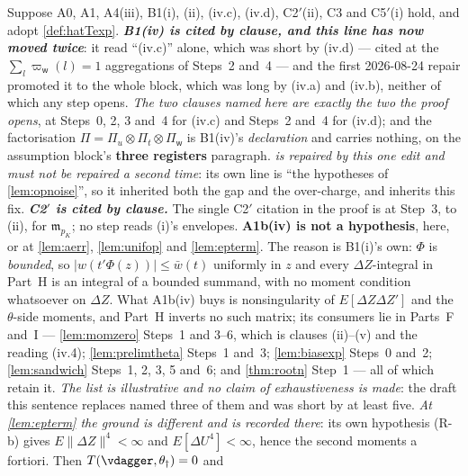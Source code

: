 \begin{lemma}\label{lem:opnoise}
Suppose A0, A1, A4(iii), B1(i), (ii), (iv.c), (iv.d), C2$'$(ii), C3 and C5$'$(i) hold, and adopt
\cref{def:hatTexp}.
\emph{\textbf{B1(iv) is cited by clause, and this line has now moved twice}}: it read
``\textup{(iv.c)}'' alone, which was short by \textup{(iv.d)} --- cited at the
$\sum_l\varpi_{\mathsf w}(l)=1$ aggregations of Steps~2 and~4 --- and the first 2026-08-24 repair
promoted it to the whole block, which was long by \textup{(iv.a)} and \textup{(iv.b)}, neither of which
any step opens. \emph{The two clauses named here are exactly the two the proof opens}, at Steps~0, 2, 3
and~4 for \textup{(iv.c)} and Steps~2 and~4 for \textup{(iv.d)}; and the factorisation
$\Pi=\Pi_u\otimes\Pi_t\otimes\Pi_{\mathsf w}$ is B1(iv)'s \emph{declaration} and carries nothing, on the
assumption block's \textbf{three registers} paragraph. \emph{ is repaired by this one
edit and must not be repaired a second time}: its own line is ``the hypotheses of \cref{lem:opnoise}'',
so it inherited both the gap and the over-charge, and inherits this fix.
\emph{\textbf{C2$'$ is cited by clause.}} The single C2$'$ citation in the proof is
at Step~3, to (ii), for $\mathfrak m_{p_K}$; no step reads (i)'s envelopes.
\textbf{A1b(iv) is \textbf{not} a hypothesis}, here, or at \cref{lem:aerr}, \cref{lem:unifop}
and \cref{lem:epterm}. The reason is B1(i)'s own: $\Phi$ is \emph{bounded}, so
$|w(t'\Phi(z))|\le\bar w(t)$ uniformly in
$z$ and every $\Delta Z$-integral in Part~H is an integral of a bounded summand, with no moment
condition whatsoever on $\Delta Z$. What A1b(iv) buys is nonsingularity of
$E[\Delta Z\Delta Z']$ and the $\theta$-side moments, and Part~H inverts no such matrix; its consumers
lie in Parts~F and~I --- \cref{lem:momzero} Steps~1 and 3--6, which is clauses \textup{(ii)}--\textup{(v)}
and the reading \textup{(iv.4)}; \cref{lem:prelimtheta} Steps~1 and~3; \cref{lem:biasexp} Steps~0
and~2; \cref{lem:sandwich} Steps~1, 2, 3, 5 and~6; and \cref{thm:rootn} Step~1 --- all of which retain
it. \emph{The list is illustrative and no claim of exhaustiveness is made}: the draft this sentence
replaces named three of them and was short by at least five. \emph{At \cref{lem:epterm} the ground is different and is recorded there}: its own
hypothesis (R-b) gives $E\|\Delta Z\|^{4}<\infty$ and $E[\Delta U^{4}]<\infty$, hence the second moments a
fortiori. Then $T(\vdagger,\theta_\dagger)=0$ and

\end{lemma}
